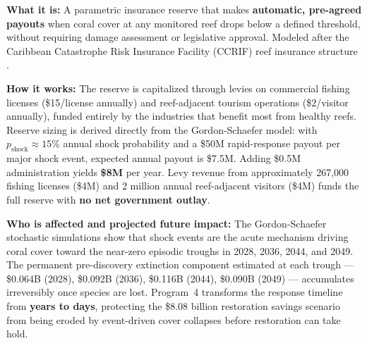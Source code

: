 \documentclass[10pt,letterpaper]{article}
\newcounter{gs}
\begin{document}
\begin{tcolorbox}[title=Program 4: National Reef Insurance Reserve --- \$8M Annual Total,
  colback=red!5, colframe=red!50!black, fonttitle=\bfseries, breakable]

  \textbf{What it is:} A parametric insurance reserve that makes \textbf{automatic, pre-agreed payouts} when coral cover at any monitored reef drops below a defined threshold, without requiring damage assessment or legislative approval. Modeled after the Caribbean Catastrophe Risk Insurance Facility (CCRIF) reef insurance structure \cite{ccrif_reef_insurance}.

  \medskip
  \textbf{How it works:} The reserve is capitalized through levies on commercial fishing licenses (\$15/license annually) and reef-adjacent tourism operations (\$2/visitor annually), funded entirely by the industries that benefit most from healthy reefs. Reserve sizing is derived directly from the Gordon-Schaefer model: with $p_{\text{shock}} \approx 15\%$ annual shock probability and a \$50M rapid-response payout per major shock event, expected annual payout is \$7.5M. Adding \$0.5M administration yields \textbf{\$8M} per year. Levy revenue from approximately 267,000 fishing licenses (\$4M) and 2 million annual reef-adjacent visitors (\$4M) funds the full reserve with \textbf{no net government outlay}.

  \medskip
  \textbf{Who is affected and projected future impact:} The Gordon-Schaefer stochastic simulations show that shock events are the acute mechanism driving coral cover toward the near-zero episodic troughs in 2028, 2036, 2044, and 2049. The permanent pre-discovery extinction component estimated at each trough --- \$0.064B (2028), \$0.092B (2036), \$0.116B (2044), \$0.090B (2049) --- accumulates irreversibly once species are lost. Program~4 transforms the response timeline from \textbf{years to days}, protecting the \$8.08 billion restoration savings scenario from being eroded by event-driven cover collapses before restoration can take hold.
\end{tcolorbox}

\medskip
\end{document}
